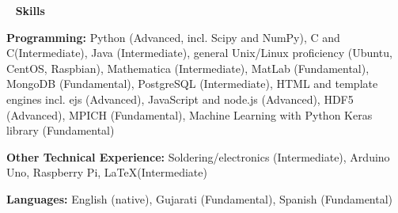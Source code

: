 \documentclass[8pt]{article}
\def \primarycolor   {spacecadet}
\def \titlerectmin{0.15cm}
\def \titlerectmax{0.35cm}
\def \leftcolwidth{3.05cm}
\newcommand{\CPP}
{C\nolinebreak[4]\hspace{-.05em}\raisebox{.22ex}{\footnotesize\bf ++}}
\newcommand{\cvheader}[1]{
    \tikz{\fill [\primarycolor] (0,\titlerectmin) rectangle (\leftcolwidth,\titlerectmax);} \ 
    \textcolor{\primarycolor}{ \large{\textbf{#1}} } 
}
\begin{document}
\cvheader{Skills}

\begin{description*}
	\item{
	\textbf{Programming:} Python (Advanced, incl. Scipy and NumPy), C and \CPP (Intermediate), Java (Intermediate), general Unix/Linux proficiency (Ubuntu, CentOS, Raspbian), Mathematica (Intermediate), MatLab (Fundamental), MongoDB (Fundamental), PostgreSQL (Intermediate), HTML and template engines incl. ejs (Advanced), JavaScript and node.js (Advanced), HDF5 (Advanced), MPICH (Fundamental), Machine Learning with Python Keras library (Fundamental)
	}
	
	\item{
	\textbf{Other Technical Experience:} Soldering/electronics (Intermediate), Arduino Uno, Raspberry Pi, \LaTeX (Intermediate)
	}
	
	\item{
	\textbf{Languages:} English (native), Gujarati (Fundamental), Spanish (Fundamental)
	}
	
\end{description*}

\iffalse
Noah Wolfe is an undergraduate student and Park Scholar pursuing degrees in both Physics and Mathematics at North Carolina State University (NC State). His work thus far has combined his talent for programming with his love of astrophysics, as he has studied core-collapse supernovae, neutron stars, and gravitational waves with state-of-the-art simulations. However, his astrophysical research interests are not limited to the theoretical; he has recently become involved in a project to study the environment surrounding Sagittarius A* with ALMA observations. Noah also strongly believes in serving his communities. As President of the Astronomy Club, he has lead scientific outreach events both on-campus and in the greater Raleigh community. He has also lead the development of low-cost air quality sensor networks, in order to collect air quality data in rural, socioeconomically disadvantaged regions of North Carolina where this data does not currently exist. In his free time, Noah enjoys playing the drum set, baking vegan desserts, hiking, and reading sci-fi novels. 
\fi
\end{document}
